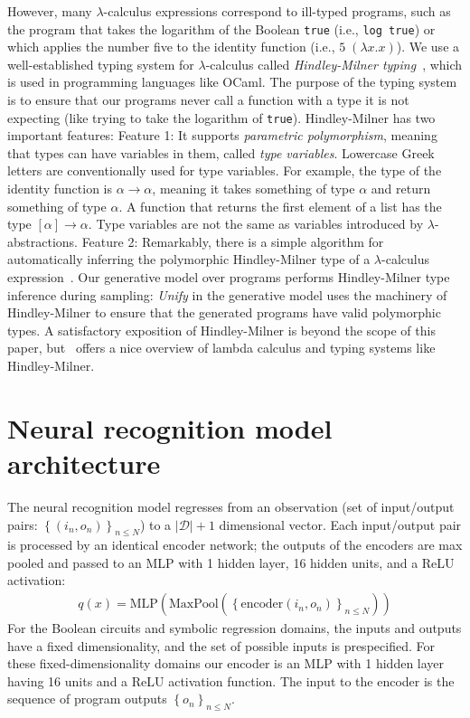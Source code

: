 \documentclass{article}
\begin{document}
However, many $\lambda$-calculus expressions correspond to ill-typed programs, such as the program that takes the logarithm of the Boolean \texttt{true} (i.e., \texttt{log true}) or which applies the number five to the identity function
(i.e., $5 \; (\lambda x.x)$).
We use a well-established typing system for $\lambda$-calculus called \emph{Hindley-Milner typing}~\cite{pierce}, which is used in programming languages like OCaml.
The purpose of the typing system is to ensure that our programs never call a function with a type it is not expecting (like trying to take the logarithm of \texttt{true}).
Hindley-Milner has two important features:
Feature 1: It supports \emph{parametric polymorphism}, meaning that types can have variables in them, called \emph{type variables}. Lowercase Greek letters are conventionally used for  type variables.
For example, the type of the identity function is $\alpha\to\alpha$, meaning it takes something of type $\alpha$ and return something of type $\alpha$. A function that returns the first element of a list has the type $[\alpha]\to\alpha$. Type variables are not the same as variables introduced by $\lambda$-abstractions.
Feature 2: Remarkably, there is a  simple algorithm for automatically inferring the polymorphic Hindley-Milner type of a $\lambda$-calculus expression~\cite{damas1982principal}.
Our generative model over programs performs Hindley-Milner type inference during sampling:
\emph{Unify} in the generative model uses the machinery of Hindley-Milner to
ensure that the generated programs have valid polymorphic types.
A satisfactory exposition of Hindley-Milner is beyond the scope of this paper,
but~\cite{pierce} offers a nice overview of lambda calculus and typing systems like Hindley-Milner.


\section{Neural recognition model architecture}

The neural recognition model regresses from an observation (set of input/output pairs: $\left\{(i_n,o_n) \right\}_{n\leq N}$) to a $|\mathcal{D}| + 1$ dimensional vector. Each input/output pair is processed by an identical encoder network;
the outputs of the encoders are max pooled and passed to an MLP with 1 hidden layer, 16 hidden units, and a ReLU activation:
\begin{align}
  q(x) = \text{MLP}\left(\text{MaxPool}\left(\left\{\text{encoder}\left(i_n,o_n \right) \right\}_{n\leq N} \right) \right)
\end{align}
For the Boolean circuits and symbolic regression domains,
the inputs and outputs have a fixed dimensionality,
and the set of possible inputs is prespecified. For these fixed-dimensionality domains our encoder is an MLP with 1 hidden layer having 16  units and a ReLU activation function. The input to the encoder is
the sequence of program outputs $\left\{o_n \right\}_{n\leq N}$.
\end{document}
